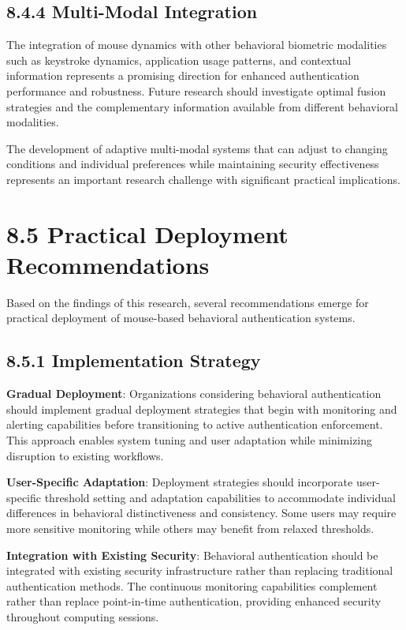 \documentclass[
  12pt,
  a4paper,
]{report}
\begin{document}
\subsection{8.4.4 Multi-Modal
Integration}\label{multi-modal-integration-1}

The integration of mouse dynamics with other behavioral biometric
modalities such as keystroke dynamics, application usage patterns, and
contextual information represents a promising direction for enhanced
authentication performance and robustness. Future research should
investigate optimal fusion strategies and the complementary information
available from different behavioral modalities.

The development of adaptive multi-modal systems that can adjust to
changing conditions and individual preferences while maintaining
security effectiveness represents an important research challenge with
significant practical implications.

\section{8.5 Practical Deployment
Recommendations}\label{practical-deployment-recommendations}

Based on the findings of this research, several recommendations emerge
for practical deployment of mouse-based behavioral authentication
systems.

\subsection{8.5.1 Implementation
Strategy}\label{implementation-strategy}

\textbf{Gradual Deployment}: Organizations considering behavioral
authentication should implement gradual deployment strategies that begin
with monitoring and alerting capabilities before transitioning to active
authentication enforcement. This approach enables system tuning and user
adaptation while minimizing disruption to existing workflows.

\textbf{User-Specific Adaptation}: Deployment strategies should
incorporate user-specific threshold setting and adaptation capabilities
to accommodate individual differences in behavioral distinctiveness and
consistency. Some users may require more sensitive monitoring while
others may benefit from relaxed thresholds.

\textbf{Integration with Existing Security}: Behavioral authentication
should be integrated with existing security infrastructure rather than
replacing traditional authentication methods. The continuous monitoring
capabilities complement rather than replace point-in-time
authentication, providing enhanced security throughout computing
sessions.
\end{document}
